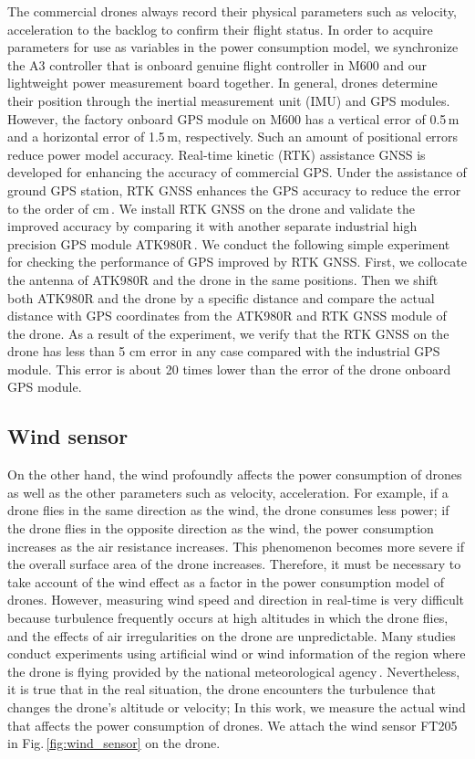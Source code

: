\documentclass[journal]{./template/IEEEtran}
\begin{document}
The commercial drones always record their physical parameters such as velocity, acceleration to the backlog to confirm their flight status. 
In order to acquire parameters for use as variables in the power consumption model, we synchronize the A3 controller that is onboard genuine flight controller in M600 and our lightweight power measurement board together. 
In general, drones determine their position through the inertial measurement unit (IMU) and GPS modules. 
However, the factory onboard GPS module on M600 has a vertical error of 0.5\,m and a horizontal error of 1.5\,m, respectively. 
Such an amount of positional errors reduce power model accuracy.
Real-time kinetic (RTK) assistance GNSS is developed for enhancing the accuracy of commercial GPS.
Under the assistance of ground GPS station, RTK GNSS enhances the GPS accuracy to reduce the error to the order of cm\,\cite{ref_13}.
We install RTK GNSS on the drone and validate the improved accuracy by comparing it with another separate industrial high precision GPS module ATK980R\,\cite{ref_14}.
We conduct the following simple experiment for checking the performance of GPS improved by RTK GNSS.
First, we collocate the antenna of ATK980R and the drone in the same positions. 
Then we shift both ATK980R and the drone by a specific distance and compare the actual distance with GPS coordinates from the ATK980R and RTK GNSS module of the drone.
As a result of the experiment, we verify that the RTK GNSS on the drone has less than 5 cm error in any case compared with the industrial GPS module. This error is about 20 times lower than the error of the drone onboard GPS module.




\subsection{Wind sensor}

On the other hand, the wind profoundly affects the power consumption of drones as well as the other parameters such as velocity, acceleration.
For example, if a drone flies in the same direction as the wind, the drone consumes less power; if the drone flies in the opposite direction as the wind, the power consumption increases as the air resistance increases. 
This phenomenon becomes more severe if the overall surface area of the drone increases.
Therefore, it must be necessary to take account of the wind effect as a factor in the power consumption model of drones. 
However, measuring wind speed and direction in real-time is very difficult because turbulence frequently occurs at high altitudes in which the drone flies, and the effects of air irregularities on the drone are unpredictable.
Many studies conduct experiments using artificial wind or wind information of the region where the drone is flying provided by the national meteorological agency\,\cite{ref_5,ref_9}. 
Nevertheless, it is true that in the real situation, the drone encounters the turbulence that changes the drone's altitude or velocity; 
In this work, we measure the actual wind that affects the power consumption of drones. 
We attach the wind sensor FT205\,\cite{ref_15} in Fig.\,\ref{fig:wind_sensor} on the drone. 
\end{document}
